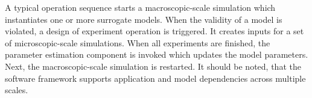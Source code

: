A typical operation sequence starts a macroscopic-scale simulation which
instantiates one or more surrogate models. When the validity of a model is
violated, a design of experiment operation is triggered. It creates inputs for a
set of microscopic-scale simulations.  When all experiments are finished, the
parameter estimation component is invoked which updates the model parameters.
Next, the macroscopic-scale simulation is restarted. It should be noted, that
the {\MoDeNa} software framework supports application and model dependencies
across multiple scales.
